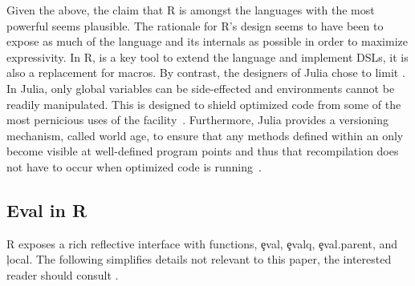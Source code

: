 \documentclass[review,nonacm,screen,acmsmall,anonymous=true]{acmart}
\begin{document}
Given the above, the claim that R is amongst the languages with the most
powerful \eval seems plausible. The rationale for R's design seems to have been
to expose as much of the language and its internals as possible in order to
maximize expressivity. In R, \eval is a key tool to extend the language and
implement DSLs, it is also a replacement for macros. By contrast, the designers
of Julia chose to limit \eval. In Julia, only global variables can be
side-effected and environments cannot be readily manipulated. This is designed
to shield optimized code from some of the most pernicious uses of the
facility~\cite{oopsla18a}. Furthermore, Julia provides a versioning
mechanism, called world age, to ensure that any methods defined within an \eval
only become visible at well-defined program points and thus that recompilation
does not have to occur when optimized code is running~\cite{oopsla20a}.

\subsection{Eval in R}\label{sec:eval-in-r}

R exposes a rich reflective interface with functions, \c{eval},
\c{evalq}, \c{eval.parent}, and \c{local}. The following simplifies details not
relevant to this paper, the interested reader should consult \citet{hadley}.
\end{document}
